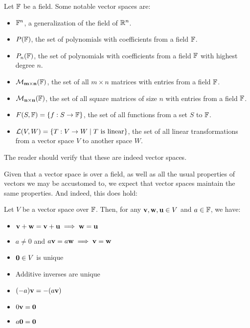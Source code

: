 \documentclass{article}
\begin{document}
\begin{crll}
Let $ \mathbb{F} $ be a field. Some notable vector spaces are:
\begin{itemize}
    \item $ \mathbb{F}^{n} $, a generalization of the field of $ \mathbb{R}^{n} $.
    \item $ P(\mathbb{F}) $, the set of polynomials with coefficients from a field $ \mathbb{F} $.
    \item $ P_{n}(\mathbb{F}) $, the set of polynomials with coefficients from a field $ \mathbb{F} $ with highest degree $ n $.
    \item $ \mathcal{M}_{\mathbf{m \times n}}(\mathbb{F}) $, the set of all $ m \times n $ matrices with entries from a field $ \mathbb{F} $.
    \item $ \mathcal{M}_{\mathbf{n \times n}}(\mathbb{F}) $, the set of all square matrices of size $ n $ with entries from a field $ \mathbb{F} $.
    \item $ \relax{F}(S, \mathbb{F}) = \left\{{f : S \rightarrow \mathbb{F}}\right\} $, the set of all functions from a set $ S $ to $ \mathbb{F} $.
    \item $ \mathcal{L}(V, W) = \left\{{T : V \rightarrow W \mid T \textrm{ is linear}}\right\} $, the set of all linear transformations from a vector space $ V $ to another space $ W $.
\end{itemize}
The reader should verify that these are indeed vector spaces.
\end{crll}

Given that a vector space is over a field, as well as all the usual properties of vectors we may be accustomed to, we expect that vector spaces maintain the same properties. And indeed, this does hold:

\begin{lm}
Let $ V $ be a vector space over $ \mathbb{F} $. Then, for any $ \mathbf{v, w, u} \in V $ and $ a \in \mathbb{F} $, we have:
\begin{itemize}
    \item $ \mathbf{v + w} = \mathbf{v + u} \implies \mathbf{w = u} $
    \item $ a \neq 0 $ and $ a\mathbf{v} = a\mathbf{w} \implies \mathbf{v = w} $
    \item $ \mathbf{0} \in V $ is unique
    \item Additive inverses are unique
    \item $ (-a)\mathbf{v} = -(a\mathbf{v}) $
    \item $ 0\mathbf{v} = \mathbf{0} $
    \item $ a\mathbf{0 = 0} $
\end{itemize}
\end{lm}
\end{document}
